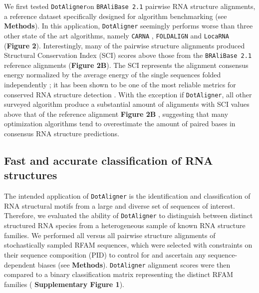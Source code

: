 \documentclass{bmcart}
\newcommand\dotaligner{\texttt{DotAligner}}
\newcommand\bralibase{\texttt{BRAliBase 2.1}}
\newcommand\locarna{\texttt{LocaRNA}}
\newcommand\foldalign{\texttt{FOLDALIGN}}
\newcommand\carna{\texttt{CARNA}}
\begin{document}
We first tested \dotaligner on \bralibase{} pairwise RNA structure alignments, a reference 
dataset specifically designed for algorithm benchmarking 
\cite{Gardner15860779,wilm2006enhanced} (see \textbf{Methods}). In this application, \dotaligner{} seemingly  
performs worse than three other state of the art algorithms, namely \carna{} \cite{Sorescu2012}, \foldalign{} \cite{havgaard2007fast,sundfeld2015foldalign} and \locarna{} \cite{Will17432929}
(\textbf{Figure 2}). Interestingly, many of the pairwise structure alignments produced Structural 
Conservation Index (SCI) scores above those from the \bralibase{} reference alignments 
(\textbf{Figure 2B}). The SCI represents the alignment consensus energy normalized
 by the average energy of the single sequences folded independently \cite{washietl2005fast}; 
it has been shown to be one of the most reliable metrics for conserved RNA structure 
detection \cite{gruber2008strategies}. With the exception if \dotaligner{}, all other 
surveyed algorithm produce a substantial amount of alignments with SCI values 
above that of the reference  alignment \textbf{Figure 2B }, suggesting that many optimization 
algorithms tend to overestimate the amount of paired bases in consensus RNA structure predictions. \\

\subsection*{Fast and accurate classification of RNA structures} 

The intended application of \dotaligner{}  is the identification and
classification of RNA structural motifs from a large and diverse set of sequences of interest. 
Therefore, we evaluated the ability of \dotaligner{} to distinguish between distinct structured 
RNA species from a heterogeneous sample of known RNA structure families. 
We performed all versus all pairwise structure alignments of stochastically sampled RFAM sequences, 
which were selected with constraints on their sequence composition (PID) to 
control for and ascertain any sequence-dependent biases (see \textbf{Methods}). 
\dotaligner{} alignment scores were then compared to a binary classification matrix 
representing the distinct RFAM families ( \textbf{Supplementary Figure 1}).\\
\end{document}
